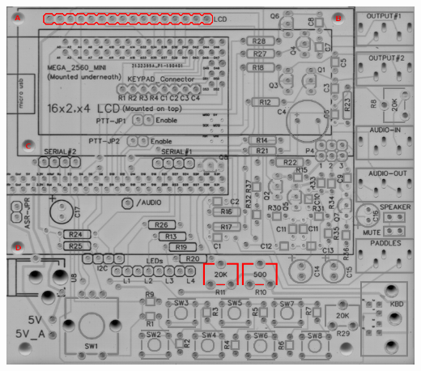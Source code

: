\documentclass[11pt]{article}
\begin{document}
\begin{center}
\includegraphics[width=.9\linewidth]{../png/3.4/pcb-top-display-serial.png}
\end{center}
\end{document}
